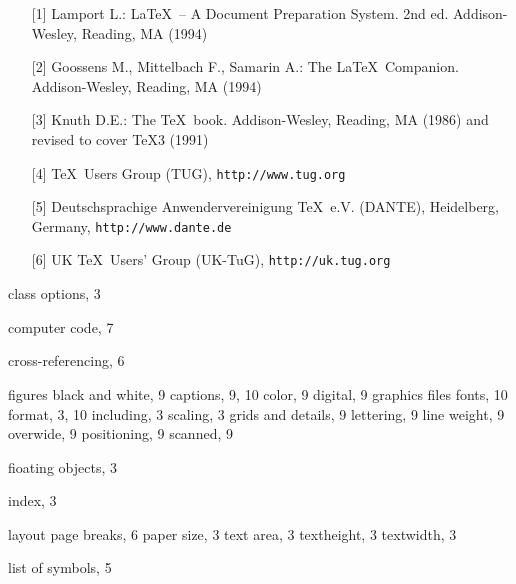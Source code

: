 \documentclass[graybox]{svmult}
\begin{document}
\begin{refguide}
\begin{sloppy}
\begin{enumerate}
\item[{[1]}] Lamport L.: \LaTeX~-- A Document Preparation System. 2nd ed. Addison-Wesley, Reading, MA (1994)
\item[{[2]}] Goossens M., Mittelbach F., Samarin A.: The \LaTeX~Companion. Addison-Wesley, Reading, MA (1994)
\item[{[3]}] Knuth D.E.: The \TeX~book. Addison-Wesley, Reading, MA (1986) and revised to cover \TeX3 (1991)
\item[{[4]}] \TeX~Users Group (TUG), \texttt{http://www.tug.org}
\item[{[5]}] Deutschsprachige Anwendervereinigung \TeX~e.V. (DANTE), Heidelberg, Germany, \texttt{http://www.dante.de}
\item[{[6]}] UK \TeX~Users' Group (UK-TuG), \texttt{http://uk.tug.org}
\end{enumerate}

\end{sloppy}

\def\indexname{Subject Index}


\begin{theindex}

\vspace*{-13pc}



\item class options, 3
\item computer code, 7
\item cross-referencing, 6
  \indexspace

  figures
\subitem black and white, 9
\subitem captions, 9, 10
\subitem color, 9
\subitem digital, 9
\subitem graphics files
\subsubitem fonts, 10
\subsubitem format, 3, 10
\subsubitem including, 3
\subsubitem scaling, 3
\subitem grids and details, 9
\subitem lettering, 9
\subitem line weight, 9
\subitem overwide, 9
\subitem positioning, 9
\subitem scanned, 9
\item fioating objects, 3

\indexspace

\item index, 3

\indexspace

\item layout
\subitem page breaks, 6
\subitem paper size, 3
\subitem text area, 3
\subitem textheight, 3
\subitem textwidth, 3
\item list of symbols, 5


\end{theindex}
\end{refguide}
\end{document}
